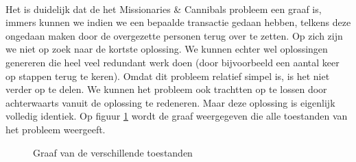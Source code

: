 \paragraph{}
\begin{leftbar}
Het is duidelijk dat de het Missionaries \& Cannibals probleem een graaf is, immers kunnen we indien we een bepaalde transactie gedaan hebben, telkens deze ongedaan maken door de overgezette personen terug over te zetten. Op zich zijn we niet op zoek naar de kortste oplossing. We kunnen echter wel oplossingen genereren die heel veel redundant werk doen (door bijvoorbeeld een aantal keer op stappen terug te keren). Omdat dit probleem relatief simpel is, is het niet verder op te delen. We kunnen het probleem ook trachtten op te lossen door achterwaarts vanuit de oplossing te redeneren. Maar deze oplossing is eigenlijk volledig identiek. Op figuur \ref{fig:missionariesAndCannibalsGraph} wordt de graaf weergegeven die alle toestanden van het probleem weergeeft.
\end{leftbar}
\begin{figure}[htb]
\centering
{}
\caption{Graaf van de verschillende toestanden}
\label{fig:missionariesAndCannibalsGraph}
\end{figure}
